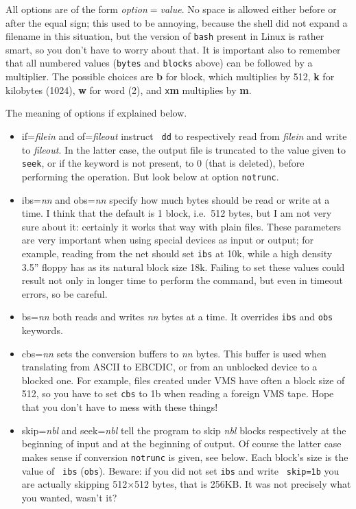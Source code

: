 All options are of the form {\em option$=$value}. No
space is allowed either before or after the equal sign; this used to
be annoying, because the shell did not expand a filename in this
situation, but the version of {\tt bash} present in Linux is rather
smart, so you don't have to worry about that.  It is important also to
remember that all numbered values ({\tt bytes} and {\tt blocks} above)
can be followed by a multiplier. The possible choices are {\bf b} for
block, which multiplies by 512, {\bf k} for kilobytes (1024), {\bf w}
for word (2), and {\tt x}{\bf m} multiplies by {\bf m}.

The meaning of options if explained below.

\begin{itemize}

\item {\sf if={\em filein\/}} and {\sf of={\em fileout\/}} instruct {\tt
dd} to respectively read from {\em filein\/} and write to {\em fileout\/}.
In the latter case, the output file is truncated to the value given to {\tt
seek}, or if the keyword is not present, to 0 (that is deleted), before
performing the operation. But look below at option {\tt notrunc}.

\item {\sf ibs={\em nn\/}} and {\sf obs={\em nn\/}} specify how much
bytes should be read or write at a time. I think that the default is 1
block, i.e.\ 512 bytes, but I am not very sure about it: certainly it works
that way with plain files. These parameters are very
important when using special devices as input or output; for example,
reading from the net should set {\tt ibs} at 10k, while a high density
3.5'' floppy has as its natural block size 18k. Failing to set these
values could result not only in longer time to perform the command, but
even in timeout errors, so be careful.

\item {\sf bs={\em nn\/}} both reads and writes {\em nn\/} bytes at a time.
It overrides {\tt ibs} and {\tt obs} keywords.

\item {\sf cbs={\em nn\/}} sets the conversion buffers to {\em nn\/}
bytes. This buffer is used when translating from ASCII to EBCDIC, or from 
an unblocked device to a blocked one. For example, files created under VMS
have often a block size of 512, so you have to set {\tt cbs} to 1b when 
reading a foreign VMS tape. Hope that you don't have to mess
with these things!

\item {\sf skip={\em nbl\/}} and {\sf seek={\em nbl\/}} tell the program to
skip {\em nbl\/} blocks respectively at the beginning of input and at the
beginning of output. Of course the latter case makes sense if conversion
{\tt notrunc} is given, see below. Each block's size is the value of {\tt
ibs} ({\tt obs}). Beware: if you did not set {\tt ibs} and write {\tt
skip=1b} you are actually skipping 512$\times$512 bytes, that is 256KB\@. It
was not precisely what you wanted, wasn't it?


\end{itemize}
